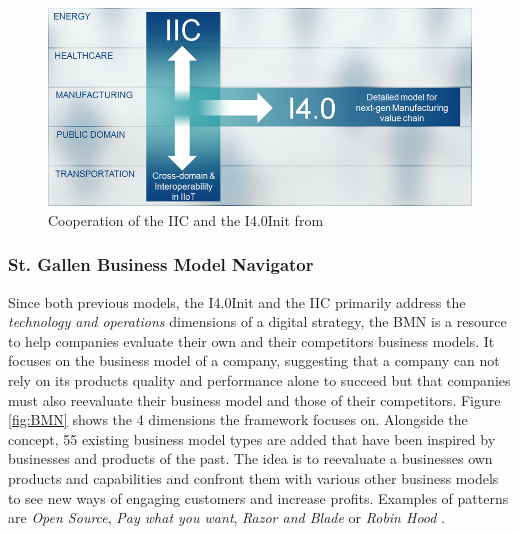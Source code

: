 \begin{figure}[H]
\centering
\includegraphics[width=1\columnwidth]{images/iici40}
\caption{Cooperation of the \ac{IIC} and the \ac{I4.0Init} from \citeauthor{iic-progress:2016} \cite{iic-progress:2016}}
\end{figure}


\subsubsection{St. Gallen Business Model Navigator}

Since both previous models, the  \ac{I4.0Init} and  the \ac{IIC} primarily address the \emph{technology and operations} dimensions of a digital strategy, the \ac{BMN} is a resource to help companies evaluate their own and their competitors business models. It focuses on the business model of a company, suggesting that a company can not rely on its products quality and performance alone to succeed but that companies must also reevaluate their business model and those of their competitors. Figure \ref{fig:BMN} shows the 4 dimensions the framework focuses on. Alongside the concept, 55 existing business model types are added that have been inspired by businesses and products of the past. The idea is to reevaluate a businesses own products and capabilities and confront them with various other business models to see new ways of engaging customers and increase profits. Examples of patterns are \emph{Open Source}, \emph{Pay what you want}, \emph{Razor and Blade} or \emph{Robin Hood} \cite{gassmann:gallen:2013geschaeftsmodelle}.

